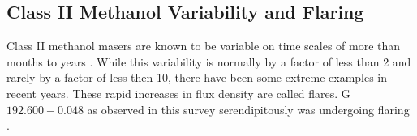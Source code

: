 %    
    \subsection{Class II Methanol Variability and Flaring}
        Class II methanol masers are known to be variable on time scales of more than months to years \citep{Caswell1995,Szymczak2018a}. While this variability is normally by a factor of less than 2 and rarely by a factor of less then 10, there have been some extreme examples in recent years.
        These rapid increases in flux density are called flares. G$192.600-0.048$ as observed in this survey serendipitously was undergoing flaring \citep{Szymczak2018a}. 
        
